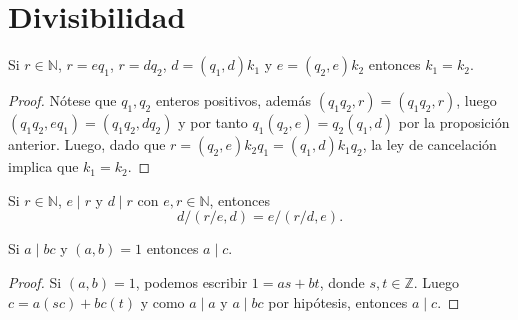 \newpage
\appendix
\section{Divisibilidad}

\begin{proposition}
Si $r \in \mathbb{N}$, $r=e q_1$, $r= d q_2$, $d=(q_1,d)k_1$ y $e=(q_2,e) k_2$ entonces $k_1=k_2$.
\end{proposition}
\begin{proof}
Nótese que $q_1,q_2$ enteros positivos, además $(q_1 q_2, r) = (q_1 q_2, r)$, luego $(q_1 q_2,e q_1)=(q_1 q_2,d q_2)$ y por tanto $q_1 (q_2,e)=q_2 (q_1,d)$ por la proposición anterior. Luego, dado que $r=(q_2,e)k_2 q_1=(q_1,d)k_1 q_2$, la ley de cancelación implica que $k_1 = k_2$.
\end{proof}

\begin{corollary}\label{cor:mcd1}
Si $r \in \mathbb{N}$, $e \mid r$ y $d \mid r$ con $e,r \in \mathbb{N}$, entonces
\begin{equation*}
    d/\left( r/e,d \right) = e/\left( r/d,e \right).
\end{equation*}
\end{corollary}

\begin{theorem}
Si $a \mid bc$ y $(a,b)=1$ entonces $a \mid c$.
\end{theorem}
\begin{proof}
Si $(a,b)=1$, podemos escribir $1=a s+b t$, donde $s,t\in \mathbb{Z}$. Luego $c=a(s c)+b c(t)$ y como $a \mid a$ y $a \mid bc$ por hipótesis, entonces $a \mid c$.
\end{proof}
